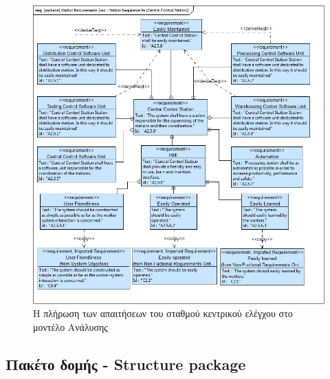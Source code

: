 \documentclass[a4paper,12pt,twoside]{report}
\begin{document}
{\begin{appendices}
			\begin{figure}[hp]
					\centering
					\includegraphics[scale=0.30]{AnalysisModel_req-StationRequirements(CentralControlStation).png}
					\caption{Η πλήρωση των απαιτήσεων του σταθμού κεντρικού ελέγχου στο μοντέλο Ανάλυσης}
					\label{φωτ:Η πλήρωση των απαιτήσεων του σταθμού κεντρικού ελέγχου στο μοντέλο Ανάλυσης}
			\end{figure}

			\FloatBarrier
			\subsection{Πακέτο δομής - Structure package}


\end{appendices}}
\end{document}
